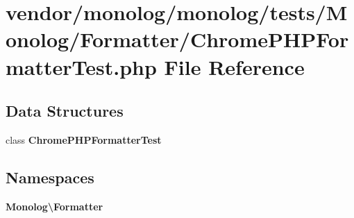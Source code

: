 \section{vendor/monolog/monolog/tests/\+Monolog/\+Formatter/\+Chrome\+P\+H\+P\+Formatter\+Test.php File Reference}
\label{_chrome_p_h_p_formatter_test_8php}
\subsection*{Data Structures}
\begin{DoxyCompactItemize}
\item 
class {\bf Chrome\+P\+H\+P\+Formatter\+Test}
\end{DoxyCompactItemize}
\subsection*{Namespaces}
\begin{DoxyCompactItemize}
\item 
 {\bf Monolog\textbackslash{}\+Formatter}
\end{DoxyCompactItemize}
